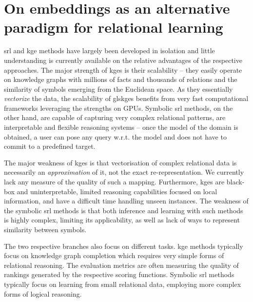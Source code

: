 \section{On embeddings as an alternative paradigm for relational learning}






\gls{srl} and \gls{kge} methods have largely been developed in isolation and little understanding is currently available on the relative advantages of the respective approaches.
The major strength of \gls{kge}s is their scalability -- they easily operate on knowledge graphs with millions of facts and thousands of relations and the similarity of symbols emerging from the Euclidean space.
As they essentially \textit{vectorize} the data, the scalability of gls{kge}s benefits from very fast computational frameworks leveraging the strengths on GPUs.
Symbolic \gls{srl} methods, on the other hand, are capable of capturing very complex relational patterns, are interpretable and flexible reasoning systems -- once the model of the domain is obtained, a user can pose any query w.r.t. the model and does not have to commit to a predefined target.



The major weakness of \gls{kge}s is that vectorisation of complex relational data is necessarily an \textit{approximation} of it, not the exact re-representation.
We currently lack any measure of the quality of such a mapping.
Furthermore, \gls{kge}s are black-box and uninterpretable, limited reasoning capabilities focused on local information, and have a difficult time handling unseen instances.
The weakness of the symbolic \gls{srl} methods is that both inference and learning with such methods is highly complex, limiting its applicability, as well as lack of ways to represent similarity between symbols.



The two respective branches also focus on different tasks.
\gls{kge} methods typically focus on knowledge graph completion which requires very simple forms of relational reasoning. The evaluation metrics are often measuring the quality of rankings generated by the respective scoring functions.
Symbolic \gls{srl} methods typically focus on learning from small relational data, employing more complex forms of logical reasoning.






